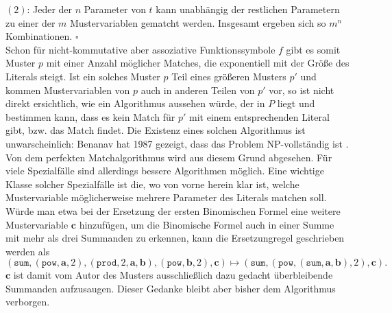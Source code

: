 $(2)$: Jeder der $n$ Parameter von $t$ kann unabhängig der restlichen Parametern zu einer der $m$ Mustervariablen gematcht werden. Insgesamt ergeben sich so $m^n$ Kombinationen.
\hfill $\square$\\

Schon für nicht-kommutative aber assoziative Funktionssymbole $f$ gibt es somit Muster $p$ mit einer Anzahl möglicher Matches, die exponentiell mit der Größe des Literals steigt. Ist ein solches Muster $p$ Teil eines größeren Musters $p'$ und kommen Mustervariablen von $p$ auch in anderen Teilen von $p'$ vor, so ist nicht direkt ersichtlich, wie ein Algorithmus aussehen würde, der in $P$ liegt und bestimmen kann, dass es kein Match für $p'$ mit einem entsprechenden Literal gibt, bzw. das Match findet. Die Existenz eines solchen Algorithmus ist unwarscheinlich: Benanav hat 1987 gezeigt, dass das Problem NP-vollständig ist \cite{NPHardMatching}.
Von dem perfekten Matchalgorithmus wird aus diesem Grund abgesehen. Für viele Spezialfälle sind allerdings bessere Algorithmen möglich. Eine wichtige Klasse solcher Spezialfälle ist die, wo von vorne herein klar ist, welche Mustervariable möglicherweise mehrere Parameter des Literals matchen soll. Würde man etwa bei der Ersetzung der ersten Binomischen Formel eine weitere Mustervariable $\mathbf c$ hinzufügen, um die Binomische Formel auch in einer Summe mit mehr als drei Summanden zu erkennen, kann die Ersetzungregel geschrieben werden als
$$(\texttt{sum}, (\texttt{pow}, \mathbf a, 2), (\texttt{prod}, 2, \mathbf a, \mathbf b), (\texttt{pow}, \mathbf b, 2), \mathbf c) \mapsto (\texttt{sum}, (\texttt{pow}, (\texttt{sum}, \mathbf a, \mathbf b), 2), \mathbf c).$$
$\mathbf c$ ist damit vom Autor des Musters ausschließlich dazu gedacht überbleibende Summanden \glqq aufzusaugen\grqq{}. Dieser Gedanke bleibt aber bisher dem Algorithmus verborgen.
